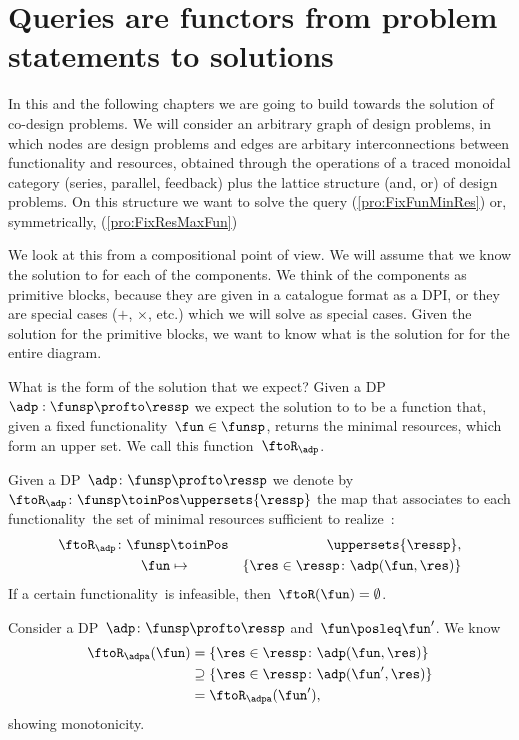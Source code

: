 \section{Queries are functors from problem statements to solutions}

\publictodomessage

In this and the following chapters we are going to build towards the solution of co-design problems.
We will consider an arbitrary graph of design problems, in which nodes are design problems and edges are arbitary interconnections between functionality and resources, obtained through the operations of a traced monoidal category (series, parallel, feedback) plus the lattice structure (and, or) of design problems. On this structure we want to solve the query \FixFunMinRes (\cref{pro:FixFunMinRes}) or, symmetrically, \FixResMaxFun (\cref{pro:FixResMaxFun})


We look at this from a compositional point of view. We will assume that we know the solution to \FixFunMinRes for each of the components. We think of the components as primitive blocks, because they are given in a catalogue format as a DPI, or they are special cases ($+$, $\times$, etc.) which we will solve as special cases.  Given the solution for the primitive blocks, we want to know what is the solution for \FixFunMinRes for the entire diagram.

What is the form of the solution that we expect? Given a DP $\adp: \funsp \profto \ressp$ we expect the solution to \FixFunMinRes to be a function that, given a fixed functionality~$\fun\in\funsp$, returns the minimal resources, which form an upper set. We call this function~$\ftoR_\adp$.

\begin{definition}
  \label{def:ftoR-dp}
  Given a DP~$\adp\colon\funsp\profto\ressp$
  we denote by~$\ftoR_{\adp}\colon \funsp\toinPos \uppersets{\ressp}$ the map that associates
  to each functionality~\fun the set of minimal resources sufficient to realize~\fun:
  \begin{eqnarray*}
    \ftoR_{\adp}\colon \funsp & \toinPos & \uppersets{\ressp},\\
    \fun& \mapsto & \{ \res \in \ressp \colon \adp(\fun, \res)\}
  \end{eqnarray*}
  If a certain functionality~\fun is infeasible, then~$\ftoR(\fun)=\emptyset$.
\end{definition}

\begin{remark}[Monotonicity]
    Consider a DP~$\adp\colon\funsp\profto\ressp$ and~$\fun\posleq \fun'$. We know
    \begin{equation*}
        \begin{aligned}
            \ftoR_\adpa(\fun)&=\{ \res \in \ressp \colon \adp(\fun, \res)\} \\
            &\supseteq \{ \res \in \ressp \colon \adp(\fun', \res)\}\\
            &=\ftoR_\adpa(\fun'),
        \end{aligned}
    \end{equation*}
    showing monotonicity.
\end{remark}


